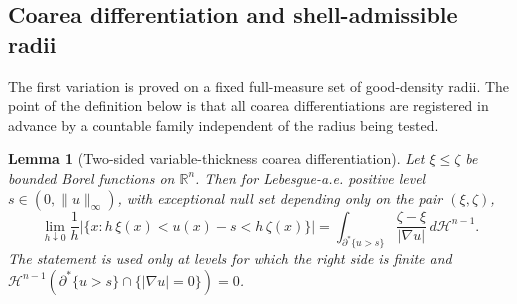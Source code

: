 \documentclass[11pt]{amsart}
\newtheorem{lemma}[theorem]{Lemma}
\theoremstyle{definition}
\newcommand{\R}{\mathbb R}
\newcommand{\Hn}{\mathcal H^{n-1}}
\begin{document}
\subsection{Coarea differentiation and shell-admissible radii}\label{sec:coarea}

The first variation is proved on a fixed full-measure set of good-density
radii.  The point of the definition below is that all coarea differentiations
are registered in advance by a countable family independent of the radius
being tested.

\begin{lemma}[Two-sided variable-thickness coarea differentiation]
\label{lem:varcoarea}
Let \(\xi\le\zeta\) be bounded Borel functions on \(\R^n\).  Then for
Lebesgue-a.e. positive level \(s\in(0,\|u\|_\infty)\), with exceptional null
set depending only on the pair \((\xi,\zeta)\),
\begin{equation}\label{eq:varcoarea}
   \lim_{h\downarrow0}\frac1h
   \bigl|\{x:h\,\xi(x)<u(x)-s<h\,\zeta(x)\}\bigr|
   =
   \int_{\partial^*\{u>s\}}\frac{\zeta-\xi}{|\nabla u|}\,d\Hn .
\end{equation}
The statement is used only at levels for which the right side is finite and
\(\Hn(\partial^*\{u>s\}\cap\{|\nabla u|=0\})=0\).
\end{lemma}
\end{document}
